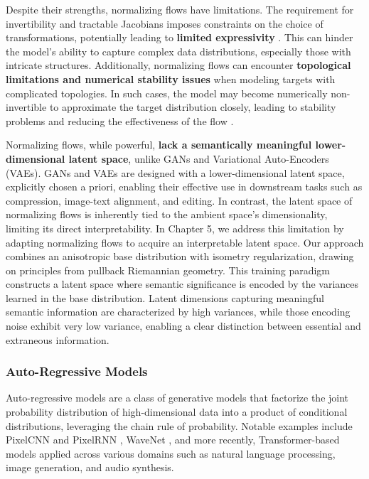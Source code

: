 Despite their strengths, normalizing flows have limitations. The requirement for invertibility and tractable Jacobians imposes constraints on the choice of transformations, potentially leading to \textbf{limited expressivity} \cite{papamakarios2019normalizing}. This can hinder the model's ability to capture complex data distributions, especially those with intricate structures. Additionally, normalizing flows can encounter \textbf{topological limitations and numerical stability issues} when modeling targets with complicated topologies. In such cases, the model may become numerically non-invertible to approximate the target distribution closely, leading to stability problems and reducing the effectiveness of the flow \cite{behrmann2021understanding, cornish2020relaxing}. 

Normalizing flows, while powerful, \textbf{lack a semantically meaningful lower-dimensional latent space}, unlike GANs and Variational Auto-Encoders (VAEs). GANs and VAEs are designed with a lower-dimensional latent space, explicitly chosen a priori, enabling their effective use in downstream tasks such as compression, image-text alignment, and editing. In contrast, the latent space of normalizing flows is inherently tied to the ambient space's dimensionality, limiting its direct interpretability. In Chapter 5, we address this limitation by adapting normalizing flows to acquire an interpretable latent space. Our approach combines an anisotropic base distribution with isometry regularization, drawing on principles from pullback Riemannian geometry. This training paradigm constructs a latent space where semantic significance is encoded by the variances learned in the base distribution. Latent dimensions capturing meaningful semantic information are characterized by high variances, while those encoding noise exhibit very low variance, enabling a clear distinction between essential and extraneous information.


\subsubsection{Auto-Regressive Models}\label{sec:auto_regressive_models}

Auto-regressive models are a class of generative models that factorize the joint probability distribution of high-dimensional data into a product of conditional distributions, leveraging the chain rule of probability. Notable examples include PixelCNN and PixelRNN \cite{oord2016pixel}, WaveNet \cite{vanwavenet2016}, and more recently, Transformer-based models \cite{vaswani2017attention} applied across various domains such as natural language processing, image generation, and audio synthesis.

